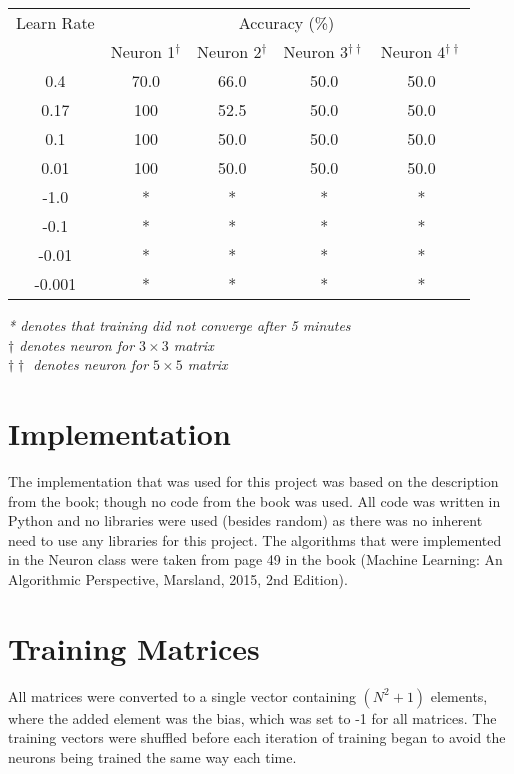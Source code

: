 \documentclass{article}
\begin{document}
\begin{minipage}{\linewidth}
	\centering
	\begin{tabular}{c|cccc}\label{T6}
		Learn Rate      & \multicolumn{4}{c}{Accuracy (\%)} \\
		& Neuron 1$^{\dagger}$ 	& Neuron 2$^{\dagger}$ 	& Neuron 3$^{\dagger\dagger}$ 	& Neuron 4$^{\dagger\dagger}$ \\
		\hline
		0.4				& 70.0   	& 66.0	  	& 50.0		& 50.0 \\
		0.17			& 100		& 52.5		& 50.0		& 50.0 \\
		0.1				& 100		& 50.0		& 50.0		& 50.0 \\
		0.01			& 100		& 50.0		& 50.0		& 50.0 \\
		-1.0			& *			& *			& *			& *	   \\
		-0.1			& *			& *			& *			& *	   \\
		-0.01			& *			& *			& *			& *	   \\
		-0.001			& *			& *			& *			& *	   \\
	\end{tabular}
	
	\bigskip
	\small
	\textit{* denotes that training did not converge after 5 minutes\\}
	\textit{$\dagger$ denotes neuron for $3\times 3$ matrix\\}
	\textit{$\dagger\dagger$ denotes neuron for $5\times 5$ matrix\\}
\end{minipage}
\linebreak
\section{Implementation}\label{S4}
	The implementation that was used for this project was based on the description from the book; though no code from the book was used. All code was written in Python and no libraries were used (besides random) as there was no inherent need to use any libraries for this project. The algorithms that were implemented in the Neuron class were taken from page 49 in the book (Machine Learning: An Algorithmic Perspective, Marsland, 2015, 2nd Edition). 
	
	
\section{Training Matrices}\label{S5}
	All matrices were converted to a single vector containing $(N^2 + 1)$ elements, where the added element was the bias, which was set to -1 for all matrices. The training vectors were shuffled before each iteration of training began to avoid the neurons being trained the same way each time.
\end{document}
